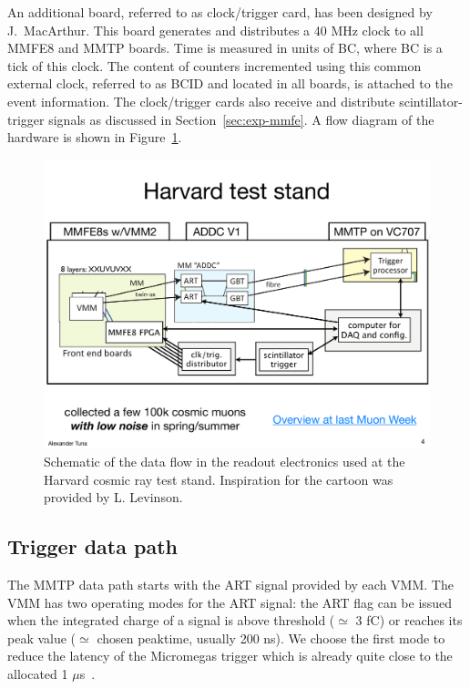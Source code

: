 An additional board, referred to as  clock/trigger card, has been designed  by J.~MacArthur.
 This board generates and distributes a 40 MHz clock to all MMFE8 and MMTP boards.
 Time is measured in units of BC, where BC is a tick of this clock.
 The content of counters incremented using this common external clock, referred to as BCID and
 located in all boards, is attached to the event information.
The clock/trigger cards also receive and distribute scintillator-trigger signals   
as discussed in Section~\ref{sec:exp-mmfe}. 
A  flow diagram of the hardware is shown in Figure~\ref{fig:cartoon_elx}.

\begin{figure}[!htpb]
  \begin{center}
    \includegraphics[width=1.0\textwidth]{figures/cartoons/electronics_path.pdf}
  \end{center}
  \vspace{-20pt}
  \caption{Schematic of the data flow in the readout electronics used at the Harvard cosmic ray test stand. 
    Inspiration for the cartoon was provided by L. Levinson.}
  \label{fig:cartoon_elx}
\end{figure}

\subsection{Trigger data path}
\label{sec:exp-art}

The MMTP data path starts with the ART signal provided by each VMM.
The VMM has two operating modes for the ART signal: the ART flag can be issued when the integrated charge of a signal is above threshold ($\simeq$ 3 fC) or reaches its peak value 
 ($\simeq$ chosen peaktime, usually 200 ns). We choose the first mode to reduce the latency of the Micromegas trigger which is already
 quite close to the allocated 1 $\mu$s~\cite{nswtdr}.

